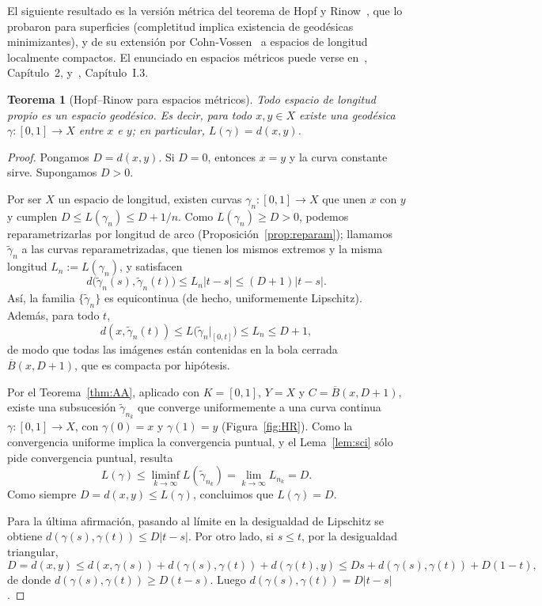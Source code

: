 \documentclass[12pt, a4paper]{amsart}
\newtheorem{teorema}{Teorema}[section]
\theoremstyle{definition}
\theoremstyle{remark}
\newcommand{\Bc}{\overline{B}}
\begin{document}
El siguiente resultado es la versión métrica del teorema de Hopf y Rinow~\cite{HR}, que lo probaron para superficies (completitud implica existencia de geodésicas minimizantes), y de su extensión por Cohn-Vossen~\cite{CV} a espacios de longitud localmente compactos. El enunciado en espacios métricos puede verse en~\cite{BBI}, Capítulo~2, y~\cite{BH}, Capítulo~I.3.

\begin{teorema}[Hopf--Rinow para espacios métricos]\label{thm:HR}
Todo espacio de longitud propio es un espacio geodésico. Es decir, para todo $x,y\in X$ existe una geodésica $\gamma\colon[0,1]\to X$ entre $x$ e $y$; en particular, $L(\gamma)=d(x,y)$.
\end{teorema}

\begin{proof}
Pongamos $D=d(x,y)$. Si $D=0$, entonces $x=y$ y la curva constante sirve. Supongamos $D>0$.

Por ser $X$ un espacio de longitud, existen curvas $\gamma_n\colon[0,1]\to X$ que unen $x$ con $y$ y cumplen $D\le L(\gamma_n)\le D+1/n$. Como $L(\gamma_n)\ge D>0$, podemos reparametrizarlas por longitud de arco (Proposición~\ref{prop:reparam}); llamamos $\tilde\gamma_n$ a las curvas reparametrizadas, que tienen los mismos extremos y la misma longitud $L_n:=L(\gamma_n)$, y satisfacen
\[
d\big(\tilde\gamma_n(s),\tilde\gamma_n(t)\big)\le L_n|t-s|\le(D+1)|t-s|.
\]
Así, la familia $\{\tilde\gamma_n\}$ es equicontinua (de hecho, uniformemente Lipschitz). Además, para todo $t$,
\[
d(x,\tilde\gamma_n(t))\le L\big(\tilde\gamma_n|_{[0,t]}\big)\le L_n\le D+1,
\]
de modo que todas las imágenes están contenidas en la bola cerrada $\Bc(x,D+1)$, que es compacta por hipótesis.

Por el Teorema~\ref{thm:AA}, aplicado con $K=[0,1]$, $Y=X$ y $C=\Bc(x,D+1)$, existe una subsucesión $\tilde\gamma_{n_k}$ que converge uniformemente a una curva continua $\gamma\colon[0,1]\to X$, con $\gamma(0)=x$ y $\gamma(1)=y$ (Figura~\ref{fig:HR}). Como la convergencia uniforme implica la convergencia puntual, y el Lema~\ref{lem:sci} sólo pide convergencia puntual, resulta
\[
L(\gamma)\le\liminf_{k\to\infty}L(\tilde\gamma_{n_k})=\lim_{k\to\infty}L_{n_k}=D.
\]
Como siempre $D=d(x,y)\le L(\gamma)$, concluimos que $L(\gamma)=D$.

Para la última afirmación, pasando al límite en la desigualdad de Lipschitz se obtiene $d(\gamma(s),\gamma(t))\le D|t-s|$. Por otro lado, si $s\le t$, por la desigualdad triangular,
\[
D=d(x,y)\le d(x,\gamma(s))+d(\gamma(s),\gamma(t))+d(\gamma(t),y)\le Ds+d(\gamma(s),\gamma(t))+D(1-t),
\]
de donde $d(\gamma(s),\gamma(t))\ge D(t-s)$. Luego $d(\gamma(s),\gamma(t))=D|t-s|$.
\end{proof}
\end{document}
